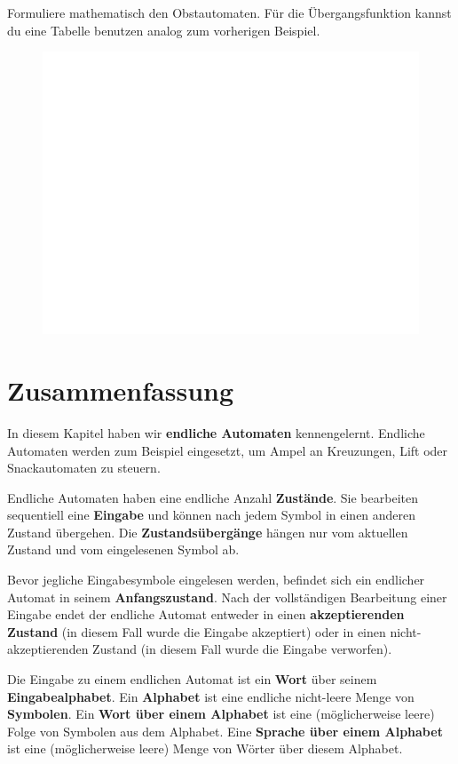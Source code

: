 \documentclass{article}
\begin{document}
\begin{exercise}
Formuliere mathematisch den Obstautomaten. Für die Übergangsfunktion kannst du eine Tabelle benutzen analog zum vorherigen Beispiel.
\begin{figure}[H]
\centering
\includegraphics[width=\linewidth]{Pictures/weiss.png} 
\end{figure}
\end{exercise}


\section{Zusammenfassung}
In diesem Kapitel haben wir \textbf{endliche Automaten} kennengelernt. Endliche Automaten werden zum Beispiel eingesetzt, um Ampel an Kreuzungen, Lift oder Snackautomaten zu steuern.

Endliche Automaten haben eine endliche Anzahl \textbf{Zustände}. Sie bearbeiten sequentiell eine \textbf{Eingabe} und können nach jedem Symbol in einen anderen Zustand übergehen. Die \textbf{Zustandsübergänge} hängen nur vom aktuellen Zustand und vom eingelesenen Symbol ab.

Bevor jegliche Eingabesymbole eingelesen werden, befindet sich ein endlicher Automat in seinem \textbf{Anfangszustand}. Nach der vollständigen Bearbeitung einer Eingabe endet der endliche Automat entweder in einen \textbf{akzeptierenden Zustand} (in diesem Fall wurde die Eingabe akzeptiert) oder in einen nicht-akzeptierenden Zustand (in diesem Fall wurde die Eingabe verworfen).

Die Eingabe zu einem endlichen Automat ist ein \textbf{Wort} über seinem \textbf{Eingabealphabet}. Ein \textbf{Alphabet} ist eine endliche nicht-leere Menge von \textbf{Symbolen}. Ein \textbf{Wort über einem Alphabet} ist eine (möglicherweise leere) Folge von Symbolen aus dem Alphabet. Eine \textbf{Sprache über einem Alphabet} ist eine (möglicherweise leere) Menge von Wörter über diesem Alphabet.

\printsolutions
\end{document}

